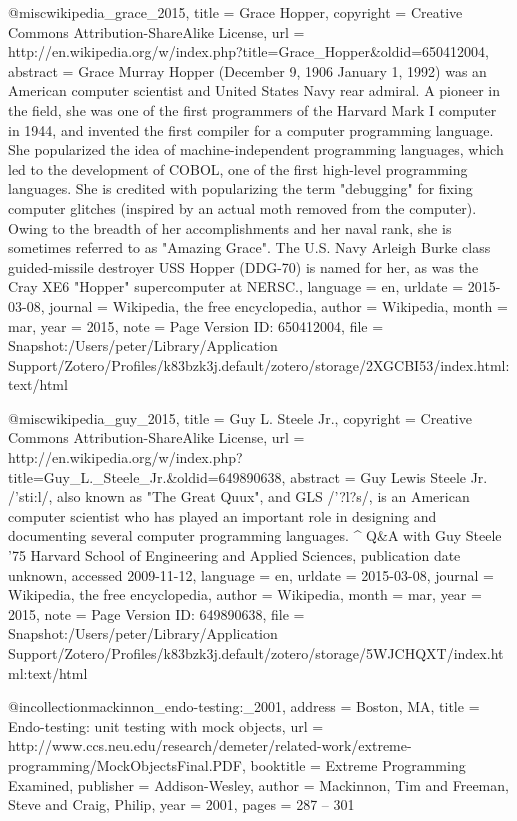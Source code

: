 {@misc{wikipedia_grace_2015,
  title     = {Grace {Hopper}},
  copyright = {Creative Commons Attribution-ShareAlike License},
  url       = {http://en.wikipedia.org/w/index.php?title=Grace_Hopper&oldid=650412004},
  abstract  = {Grace Murray Hopper (December 9, 1906 {\textendash} January 1, 1992) was an American computer scientist and United States Navy rear admiral. A pioneer in the field, she was one of the first programmers of the Harvard Mark I computer in 1944, and invented the first compiler for a computer programming language. She popularized the idea of machine-independent programming languages, which led to the development of COBOL, one of the first high-level programming languages. She is credited with popularizing the term "debugging" for fixing computer glitches (inspired by an actual moth removed from the computer). Owing to the breadth of her accomplishments and her naval rank, she is sometimes referred to as "Amazing Grace". The U.S. Navy Arleigh Burke class guided-missile destroyer USS Hopper (DDG-70) is named for her, as was the Cray XE6 "Hopper" supercomputer at NERSC.},
  language  = {en},
  urldate   = {2015-03-08},
  journal   = {Wikipedia, the free encyclopedia},
  author    = {{Wikipedia}},
  month     = mar,
  year      = {2015},
  note      = {Page Version ID: 650412004},
  file      = {Snapshot:/Users/peter/Library/Application Support/Zotero/Profiles/k83bzk3j.default/zotero/storage/2XGCBI53/index.html:text/html}
}

@misc{wikipedia_guy_2015,
  title     = {Guy {L}. {Steele} {Jr}.},
  copyright = {Creative Commons Attribution-ShareAlike License},
  url       = {http://en.wikipedia.org/w/index.php?title=Guy_L._Steele_Jr.&oldid=649890638},
  abstract  = {Guy Lewis Steele Jr. /'sti:l/, also known as "The Great Quux", and GLS /'?l?s/, is an American computer scientist who has played an important role in designing and documenting several computer programming languages.
{\textasciicircum} Q\&A with Guy Steele '75 Harvard School of Engineering and Applied Sciences, publication date unknown, accessed 2009-11-12},
  language  = {en},
  urldate   = {2015-03-08},
  journal   = {Wikipedia, the free encyclopedia},
  author    = {{Wikipedia}},
  month     = mar,
  year      = {2015},
  note      = {Page Version ID: 649890638},
  file      = {Snapshot:/Users/peter/Library/Application Support/Zotero/Profiles/k83bzk3j.default/zotero/storage/5WJCHQXT/index.html:text/html}
}

@incollection{mackinnon_endo-testing:_2001,
  address   = {Boston, MA},
  title     = {Endo-testing: unit testing with mock objects},
  url       = {http://www.ccs.neu.edu/research/demeter/related-work/extreme-programming/MockObjectsFinal.PDF},
  booktitle = {Extreme {Programming} {Examined}},
  publisher = {Addison-Wesley},
  author    = {Mackinnon, Tim and Freeman, Steve and Craig, Philip},
  year      = {2001},
  pages     = {287 -- 301}
}

}
